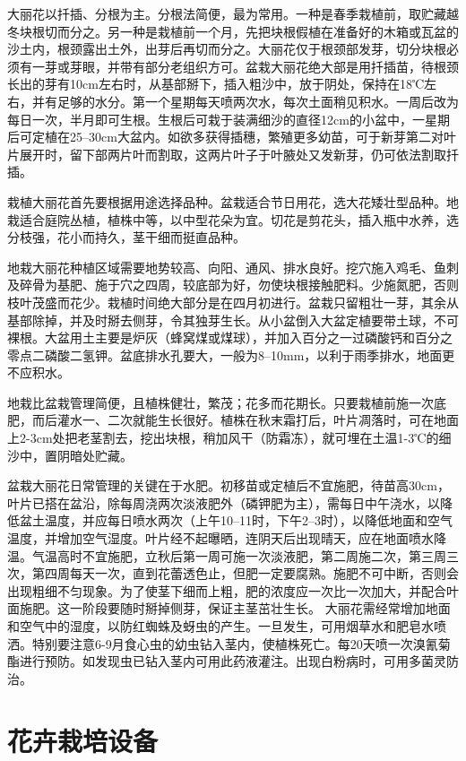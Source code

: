 \documentclass{ctexbook}
\begin{document}
大丽花以扦插、分根为主。分根法简便，最为常用。一种是春季栽植前，取贮藏越冬块根切而分之。另一种是栽植前一个月，先把块根假植在准备好的木箱或瓦盆的沙土内，根颈露出土外，出芽后再切而分之。大丽花仅于根颈部发芽，切分块根必须有一芽或芽眼，并带有部分老组织方可。盆栽大丽花绝大部是用扦插苗，待根颈长出的芽有10cm左右时，从基部掰下，插入粗沙中，放于阴处，保持在18℃左右，并有足够的水分。第一个星期每天喷两次水，每次土面稍见积水。一周后改为每日一次，半月即可生根。生根后可栽于装满细沙的直径12cm的小盆中，一星期后可定植在25--30cm大盆内。如欲多获得插穗，繁殖更多幼苗，可于新芽第二对叶片展开时，留下部两片叶而割取，这两片叶子于叶腋处又发新芽，仍可依法割取扦插。

栽植大丽花首先要根据用途选择品种。盆栽适合节日用花，选大花矮壮型品种。地栽适合庭院丛植，植株中等，以中型花朵为宜。切花是剪花头，插入瓶中水养，选分枝强，花小而持久，茎干细而挺直品种。
	
地栽大丽花种植区域需要地势较高、向阳、通风、排水良好。挖穴施入鸡毛、鱼刺及碎骨为基肥、施于穴之四周，较底部为好，勿使块根接触肥料。少施氮肥，否则枝叶茂盛而花少。栽植时间绝大部分是在四月初进行。盆栽只留粗壮一芽，其余从基部除掉，并及时掰去侧芽，令其独芽生长。从小盆倒入大盆定植要带土球，不可裸根。大盆用土主要是炉灰（蜂窝煤或煤球），并加入百分之一过磷酸钙和百分之零点二磷酸二氢钾。盆底排水孔要大，一般为8--10mm，以利于雨季排水，地面更不应积水。

地栽比盆栽管理简便，且植株健壮，繁茂；花多而花期长。只要栽植前施一次底肥，而后灌水一、二次就能生长很好。植株在秋末霜打后，叶片凋落时，可在地面上2-3cm处把老茎割去，挖出块根，稍加风干（防霜冻），就可埋在土温1-3℃的细沙中，置阴暗处贮藏。

盆栽大丽花日常管理的关键在于水肥。初移苗或定植后不宜施肥，待苗高30cm，叶片已搭在盆沿，除每周浇两次淡液肥外（磷钾肥为主），需每日中午浇水，以降低盆土温度，并应每日喷水两次（上午10--11时，下午2--3时），以降低地面和空气温度，并增加空气湿度。叶片经不起曝晒，连阴天后出现晴天，应在地面喷水降温。气温高时不宜施肥，立秋后第一周可施一次淡液肥，第二周施二次，第三周三次，第四周每天一次，直到花蕾透色止，但肥一定要腐熟。施肥不可中断，否则会出现粗细不匀现象。为了使茎下细而上粗，肥的浓度应一次比一次加大，并配合叶面施肥。这一阶段要随时掰掉侧芽，保证主茎茁壮生长。
大丽花需经常增加地面和空气中的湿度，以防红蜘蛛及蚜虫的产生。一旦发生，可用烟草水和肥皂水喷洒。特别要注意6-9月食心虫的幼虫钻入茎内，使植株死亡。每20天喷一次溴氰菊酯进行预防。如发现虫已钻入茎内可用此药液灌注。出现白粉病时，可用多菌灵防治。
\section{花卉栽培设备}
\end{document}

